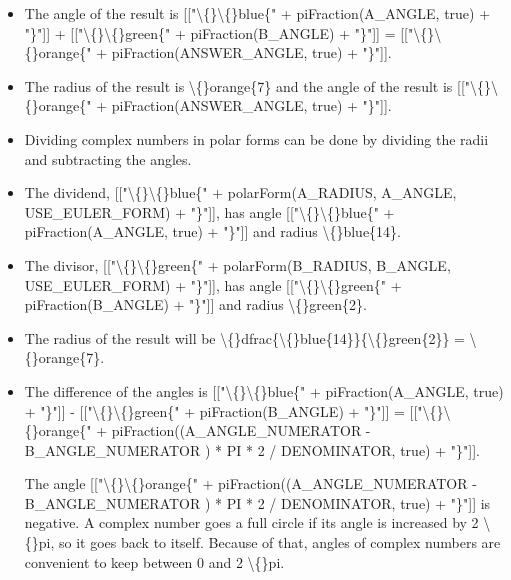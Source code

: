 \documentclass{article}
\begin{document}
\begin{itemize}
                    
                        [["\textbackslash\{\}\textbackslash\{\}orange\{" + piFraction((A\_ANGLE\_NUMERATOR - B\_ANGLE\_NUMERATOR ) * PI * 2 / DENOMINATOR, true) + "\}"]] - 2 \textbackslash\{\}pi = [["\textbackslash\{\}\textbackslash\{\}orange\{" + piFraction(ANSWER\_ANGLE, true) + "\}"]]
  \item The angle of the result is [["\textbackslash\{\}\textbackslash\{\}blue\{" + piFraction(A\_ANGLE, true) + "\}"]] + [["\textbackslash\{\}\textbackslash\{\}green\{" + piFraction(B\_ANGLE) + "\}"]] = [["\textbackslash\{\}\textbackslash\{\}orange\{" + piFraction(ANSWER\_ANGLE, true) + "\}"]].
  \item The radius of the result is \textbackslash\{\}orange\{7\}
                    and the angle of the result is [["\textbackslash\{\}\textbackslash\{\}orange\{" + piFraction(ANSWER\_ANGLE, true) + "\}"]].
  \item Dividing complex numbers in polar forms can be done by dividing the radii
                    and subtracting the angles.
  \item The dividend, [["\textbackslash\{\}\textbackslash\{\}blue\{" + polarForm(A\_RADIUS, A\_ANGLE, USE\_EULER\_FORM) + "\}"]],
                    has angle [["\textbackslash\{\}\textbackslash\{\}blue\{" + piFraction(A\_ANGLE, true) + "\}"]]
                    and radius \textbackslash\{\}blue\{14\}.
  \item The divisor, [["\textbackslash\{\}\textbackslash\{\}green\{" + polarForm(B\_RADIUS, B\_ANGLE, USE\_EULER\_FORM) + "\}"]],
                    has angle [["\textbackslash\{\}\textbackslash\{\}green\{" + piFraction(B\_ANGLE) + "\}"]]
                    and radius \textbackslash\{\}green\{2\}.
  \item The radius of the result will be
                    \textbackslash\{\}dfrac\{\textbackslash\{\}blue\{14\}\}\{\textbackslash\{\}green\{2\}\} = \textbackslash\{\}orange\{7\}.
  \item The difference of the angles is
                        [["\textbackslash\{\}\textbackslash\{\}blue\{" + piFraction(A\_ANGLE, true) + "\}"]] - [["\textbackslash\{\}\textbackslash\{\}green\{" + piFraction(B\_ANGLE) + "\}"]] = [["\textbackslash\{\}\textbackslash\{\}orange\{" + piFraction((A\_ANGLE\_NUMERATOR - B\_ANGLE\_NUMERATOR ) * PI * 2 / DENOMINATOR, true) + "\}"]].
                    
                    
                        The angle [["\textbackslash\{\}\textbackslash\{\}orange\{" + piFraction((A\_ANGLE\_NUMERATOR - B\_ANGLE\_NUMERATOR ) * PI * 2 / DENOMINATOR, true) + "\}"]] is negative.
                        A complex number goes a full circle if its angle is increased by 2 \textbackslash\{\}pi, so it goes back to itself.
                        Because of that, angles of complex numbers are convenient to keep between 0 and 2 \textbackslash\{\}pi.
                    

\end{itemize}
\end{document}
